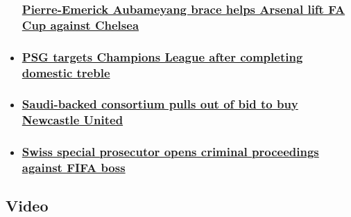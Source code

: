 \begin{itemize}
{  \subsubsection{\texorpdfstring{\href{/2020/08/01/football/arsenal-chelsea-fa-cup-final-football-spt-intl/index.html}{Pierre-Emerick
  Aubameyang brace helps Arsenal lift FA Cup against
  Chelsea}}{Pierre-Emerick Aubameyang brace helps Arsenal lift FA Cup against Chelsea}}\label{pierre-emerick-aubameyang-brace-helps-arsenal-lift-fa-cup-against-chelsea}}
\item
  \hypertarget{psg-targets-champions-league-after-completing-domestic-treble-}{%
  \subsubsection{\texorpdfstring{\href{/2020/08/01/football/psg-lyon-french-league-cup-final-spt-intl/index.html}{PSG
  targets Champions League after completing domestic treble
  }}{PSG targets Champions League after completing domestic treble }}\label{psg-targets-champions-league-after-completing-domestic-treble-}}
\item
  \hypertarget{saudi-backed-consortium-pulls-out-of-bid-to-buy-newcastle-united}{%
  \subsubsection{\texorpdfstring{\href{/2020/07/31/football/newcastle-united-takeover-withdrawal-saudi-arabia-spt-intl/index.html}{Saudi-backed
  consortium pulls out of bid to buy Newcastle
  United}}{Saudi-backed consortium pulls out of bid to buy Newcastle United}}\label{saudi-backed-consortium-pulls-out-of-bid-to-buy-newcastle-united}}
\item
  \hypertarget{swiss-special-prosecutor-opens-criminal-proceedings-against-fifa-boss}{%
  \subsubsection{\texorpdfstring{\href{/2020/07/30/football/gianni-infantino-swiss-special-prosecutor-spt-intl/index.html}{Swiss
  special prosecutor opens criminal proceedings against FIFA
  boss}}{Swiss special prosecutor opens criminal proceedings against FIFA boss}}\label{swiss-special-prosecutor-opens-criminal-proceedings-against-fifa-boss}}
\end{itemize}

\hypertarget{video-}{%
\subsection{Video~}\label{video-}}

